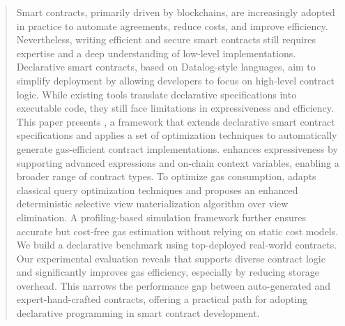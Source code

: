\begin{abstract}
Smart contracts, primarily driven by blockchains, are increasingly adopted in practice to automate agreements, reduce costs, and improve efficiency.
Nevertheless, writing efficient and secure smart contracts still requires expertise and a deep understanding of low-level implementations. Declarative smart contracts, based on Datalog-style languages, aim to simplify deployment by allowing developers to focus on high-level contract logic. While existing tools translate declarative specifications into executable code, they still face limitations in expressiveness and efficiency. This paper presents \proto, a framework that extends declarative smart contract specifications and applies a set of optimization techniques to automatically generate gas-efficient contract implementations. \proto enhances expressiveness by supporting advanced expressions and on-chain context variables, enabling a broader range of contract types. To optimize gas consumption, \proto adapts classical query optimization techniques and proposes an enhanced deterministic selective view materialization algorithm over view elimination. A profiling-based simulation framework further ensures accurate but cost-free gas estimation without relying on static cost models. 
We build a declarative benchmark using top-deployed real-world contracts. Our experimental evaluation reveals that \proto supports diverse contract logic and significantly improves gas efficiency, especially by reducing storage overhead. This narrows the performance gap between auto-generated and expert-hand-crafted contracts, offering a practical path for adopting declarative programming in smart contract development.
\end{abstract}